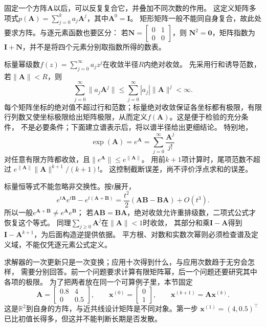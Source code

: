 固定一个方阵$\bm A$以后，可以反复复合它，并叠加不同次数的作用。
这定义矩阵多项式$p(\bm A)=\sum_{j=0}^k a_j\bm A^j$，其中$\bm A^0=\bm I$。
矩形矩阵一般不能同自身复合，故此处要求方阵。与逐元素函数也要区分：
若$\bm N=\left[\begin{smallmatrix}0&1\\0&0\end{smallmatrix}\right]$，则
$\bm N^2=\bm0$，矩阵指数为$\bm I+\bm N$，并不是将四个元素分别取指数所得的数表。

标量幂级数$f(z)=\sum_{j=0}^{\infty}a_jz^j$在收敛半径$R$内绝对收敛。
先采用行和诱导范数，若$\lVert\bm A\rVert<R$，则
\[
 \sum_{j=0}^\infty\lVert a_j\bm A^j\rVert
 \leq\sum_{j=0}^\infty|a_j|\lVert\bm A\rVert^j<\infty.
\]
每个矩阵坐标的绝对值不超过行和范数；标量绝对收敛保证各坐标都有极限，有限行列数又使坐标极限给出矩阵极限，从而定义$f(\bm A)$。这是便于检验的充分条件，
不是必要条件；下面建立谱表示后，将以谱半径给出更细结论。
特别地，
\begin{equation}
 \exp(\bm A)=e^{\bm A}=\sum_{j=0}^{\infty}\frac{\bm A^j}{j!}
 \label{eq:matrix-analysis-matrix-exponential}
\end{equation}
对任意有限方阵都收敛，且$\lVert e^{\bm A}\rVert\leq e^{\lVert\bm A\rVert}$。
用前$k+1$项计算时，尾项范数不超过
$e^{\lVert\bm A\rVert}\lVert\bm A\rVert^{k+1}/(k+1)!$。
这控制截断误差，尚不评价浮点求和的误差。

标量恒等式不能忽略非交换性。按$t$展开，
\[
 e^{t\bm A}e^{t\bm B}-e^{t(\bm A+\bm B)}
 =\frac{t^2}{2}(\bm A\bm B-\bm B\bm A)+O(t^3).
\]
所以一般$e^{\bm A+\bm B}\neq e^{\bm A}e^{\bm B}$；
若$\bm A\bm B=\bm B\bm A$，绝对收敛允许重排级数，二项式公式才恢复这个等式。
同理$\sum_{j\geq0}\bm A^j$在$\lVert\bm A\rVert<1$时收敛，
其部分和乘$\bm I-\bm A$得到$\bm I-\bm A^{k+1}$，为后面构造逆提供依据。
平方根、对数和实数次幂则必须检查谱及定义域，不能仅凭逐元素公式定义。


求解器的一次更新只是一次变换；应用十次得到什么，与应用次数趋于无穷会怎样，
需要分别回答。前一个问题要求计算有限矩阵幂，后一个问题还要研究其中各项的极限。
为了把两者放在同一个可算例子里，本节固定
\begin{equation}
 \bm A=\begin{bmatrix}0.8&4\\0&0.5\end{bmatrix},
 \qquad
 \bm x^{(0)}=\begin{bmatrix}0\\1\end{bmatrix},
 \qquad \bm x^{(k+1)}=\bm A\bm x^{(k)}.
 \label{eq:ch06-fixed-iteration-example}
\end{equation}
这是$\mathbb R^2$到自身的方阵，与近共线设计矩阵是不同对象。第一步
$\bm x^{(1)}=(4,0.5)^\top$已比初值长得多，但这并不能判断长期是否发散。


